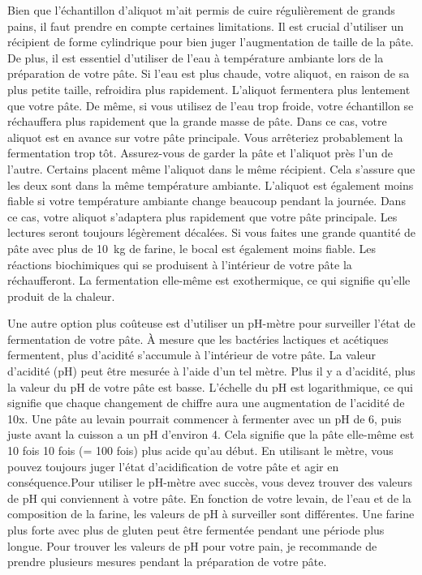 Bien que l'échantillon d'aliquot m'ait permis de cuire régulièrement de grands pains, il faut prendre en compte certaines limitations. Il est crucial d'utiliser un récipient de forme cylindrique pour bien juger l'augmentation de taille de la pâte. De plus, il est essentiel d'utiliser de l'eau à température ambiante lors de la préparation de votre pâte. Si l'eau est plus chaude, votre aliquot, en raison de sa plus petite taille, refroidira plus rapidement. L'aliquot fermentera plus lentement que votre pâte. De même, si vous utilisez de l'eau trop froide, votre échantillon se réchauffera plus rapidement que la grande masse de pâte. Dans ce cas, votre aliquot est en avance sur votre pâte principale. Vous arrêteriez probablement la fermentation trop tôt. Assurez-vous de garder la pâte et l'aliquot près l'un de l'autre. Certains placent même l'aliquot dans le même récipient. Cela s'assure que les deux sont dans la même température ambiante. L'aliquot est également moins fiable si votre température ambiante change beaucoup pendant la journée. Dans ce cas, votre aliquot s'adaptera plus rapidement que votre pâte principale. Les lectures seront toujours légèrement décalées. Si vous faites une grande quantité de pâte avec plus de \qty{10}{\kg} de farine, le bocal est également moins fiable. Les réactions biochimiques qui se produisent à l'intérieur de votre pâte la réchaufferont.
La fermentation elle-même est exothermique, ce qui signifie qu'elle produit de la chaleur.

Une autre option plus coûteuse est d'utiliser un pH-mètre pour surveiller l'état de fermentation de votre pâte. À mesure que les bactéries lactiques et acétiques fermentent, plus d'acidité s'accumule à l'intérieur de votre pâte. La valeur d'acidité (pH) peut être mesurée à l'aide d'un tel mètre. Plus il y a d'acidité, plus la valeur du pH de votre pâte est basse. L'échelle du pH est logarithmique, ce qui signifie que chaque changement de chiffre aura une augmentation de l'acidité de 10x. Une pâte au levain pourrait commencer à fermenter avec un pH de 6, puis juste avant la cuisson a un pH d'environ 4. Cela signifie que la pâte elle-même est 10 fois 10 fois (= 100 fois) plus acide qu'au début. En utilisant le mètre, vous pouvez toujours juger l'état d'acidification de votre pâte et agir en conséquence.Pour utiliser le pH-mètre avec succès, vous devez trouver des valeurs de pH
qui conviennent à votre pâte. En fonction de votre levain,
de l'eau et de la composition de la farine, les valeurs de pH à surveiller
sont différentes. Une farine plus forte avec plus de gluten
peut être fermentée pendant une période plus longue. Pour trouver
les valeurs de pH pour votre pain, je recommande de prendre
plusieurs mesures pendant la préparation de votre pâte.


